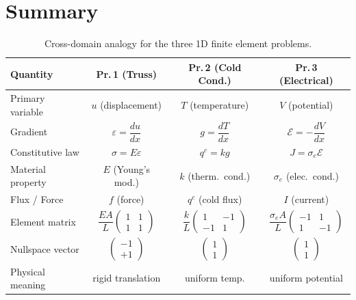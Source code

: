 \documentclass[11pt, a4paper]{article}
\begin{document}
\section{Summary}

\begin{table}[H]
    \centering
    \renewcommand{\arraystretch}{1.8}
    \begin{tabular}{|l|c|c|c|}
        \hline
        \textbf{Quantity} & \textbf{Pr.\,1 (Truss)} & \textbf{Pr.\,2 (Cold Cond.)} & \textbf{Pr.\,3 (Electrical)} \\
        \hline
        Primary variable & $u$ (displacement) & $T$ (temperature) & $V$ (potential) \\
        \hline
        Gradient & $\varepsilon = \dfrac{du}{dx}$ & $g = \dfrac{dT}{dx}$ & $\mathcal{E} = -\dfrac{dV}{dx}$ \\
        \hline
        Constitutive law & $\sigma = E\varepsilon$ & $q^c = k g$ & $J = \sigma_e \mathcal{E}$ \\
        \hline
        Material property & $E$ (Young's mod.) & $k$ (therm.\ cond.) & $\sigma_e$ (elec.\ cond.) \\
        \hline
        Flux / Force & $f$ (force) & $q^c$ (cold flux) & $I$ (current) \\
        \hline
        Element matrix & $\dfrac{EA}{L} \begin{pmatrix} 1 & 1 \\ 1 & 1 \end{pmatrix}$ & $\dfrac{k}{L} \begin{pmatrix} 1 & -1 \\ -1 & 1 \end{pmatrix}$ & $\dfrac{\sigma_e A}{L} \begin{pmatrix} -1 & 1 \\ 1 & -1 \end{pmatrix}$ \\
        \hline
        Nullspace vector & $\begin{pmatrix} -1 \\ +1 \end{pmatrix}$ & $\begin{pmatrix} 1 \\ 1 \end{pmatrix}$ & $\begin{pmatrix} 1 \\ 1 \end{pmatrix}$ \\
        \hline
        Physical meaning & rigid translation & uniform temp. & uniform potential \\
        \hline
    \end{tabular}
    \caption{Cross-domain analogy for the three 1D finite element problems.}
    \label{tab:summary}
\end{table}
\end{document}

